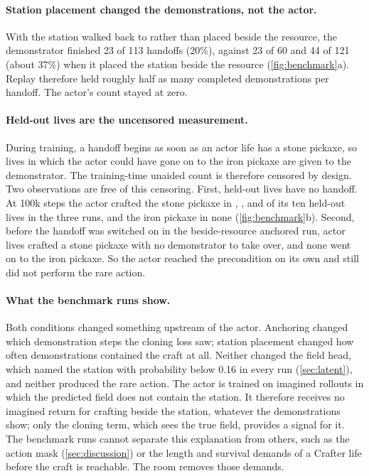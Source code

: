 \paragraph{Station placement changed the demonstrations, not the actor.}
With the station walked back to rather than placed beside the resource, the demonstrator finished 23 of 113 handoffs (20\%), against 23 of 60 and 44 of 121 (about 37\%) when it placed the station beside the resource (\cref{fig:benchmark}a).
Replay therefore held roughly half as many completed demonstrations per handoff.
The actor's count stayed at zero.

\paragraph{Held-out lives are the uncensored measurement.}
During training, a handoff begins as soon as an actor life has a stone pickaxe, so lives in which the actor could have gone on to the iron pickaxe are given to the demonstrator.
The training-time unaided count is therefore censored by design.
Two observations are free of this censoring.
First, held-out lives have no handoff. At 100k steps the actor crafted the stone pickaxe in \BenchMTwoTwoFieldCraftHeldstonefinal{}, \BenchMTwoThreeUniformWindowHeldstonefinal{}, and \BenchMTwoFourWalkHomeHeldstonefinal{} of its ten held-out lives in the three runs, and the iron pickaxe in none (\cref{fig:benchmark}b).
Second, before the handoff was switched on in the beside-resource anchored run, \EarlyStoneBeside{} actor lives crafted a stone pickaxe with no demonstrator to take over, and none went on to the iron pickaxe.
So the actor reached the precondition on its own and still did not perform the rare action.

\paragraph{What the benchmark runs show.}
Both conditions changed something upstream of the actor.
Anchoring changed which demonstration steps the cloning loss saw; station placement changed how often demonstrations contained the craft at all.
Neither changed the field head, which named the station with probability below 0.16 in every run (\cref{sec:latent}), and neither produced the rare action.
The actor is trained on imagined rollouts in which the predicted field does not contain the station. It therefore receives no imagined return for crafting beside the station, whatever the demonstrations show; only the cloning term, which sees the true field, provides a signal for it.
The benchmark runs cannot separate this explanation from others, such as the action mask (\cref{sec:discussion}) or the length and survival demands of a Crafter life before the craft is reachable.
The room removes those demands.
